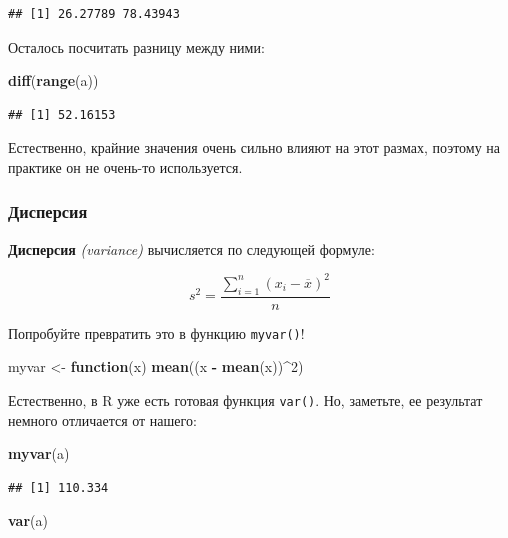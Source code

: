 \documentclass[]{book}
\newenvironment{Shaded}{\begin{snugshade}}{\end{snugshade}}
\newcommand{\KeywordTok}[1]{\textcolor[rgb]{0.13,0.29,0.53}{\textbf{#1}}}
\newcommand{\DecValTok}[1]{\textcolor[rgb]{0.00,0.00,0.81}{#1}}
\newcommand{\StringTok}[1]{\textcolor[rgb]{0.31,0.60,0.02}{#1}}
\newcommand{\ControlFlowTok}[1]{\textcolor[rgb]{0.13,0.29,0.53}{\textbf{#1}}}
\newcommand{\OperatorTok}[1]{\textcolor[rgb]{0.81,0.36,0.00}{\textbf{#1}}}
\newcommand{\NormalTok}[1]{#1}
\begin{document}
\begin{verbatim}
## [1] 26.27789 78.43943
\end{verbatim}

Осталось посчитать разницу между ними:

\begin{Shaded}
\begin{Highlighting}[]
\KeywordTok{diff}\NormalTok{(}\KeywordTok{range}\NormalTok{(a))}
\end{Highlighting}
\end{Shaded}

\begin{verbatim}
## [1] 52.16153
\end{verbatim}

Естественно, крайние значения очень сильно влияют на этот размах,
поэтому на практике он не очень-то используется.

\subsubsection{Дисперсия}\label{var}

\textbf{Дисперсия} \emph{(variance)} вычисляется по следующей формуле:

\[s^2= \frac{\sum\limits_{i=1}^{n} (x_{i} - \overline{x})^2} {n}\]

Попробуйте превратить это в функцию \texttt{myvar()}!

\begin{Shaded}
\begin{Highlighting}[]
\NormalTok{myvar <-}\StringTok{ }\ControlFlowTok{function}\NormalTok{(x) }\KeywordTok{mean}\NormalTok{((x }\OperatorTok{-}\StringTok{ }\KeywordTok{mean}\NormalTok{(x))}\OperatorTok{^}\DecValTok{2}\NormalTok{)}
\end{Highlighting}
\end{Shaded}

Естественно, в R уже есть готовая функция \texttt{var()}. Но, заметьте,
ее результат немного отличается от нашего:

\begin{Shaded}
\begin{Highlighting}[]
\KeywordTok{myvar}\NormalTok{(a)}
\end{Highlighting}
\end{Shaded}

\begin{verbatim}
## [1] 110.334
\end{verbatim}

\begin{Shaded}
\begin{Highlighting}[]
\KeywordTok{var}\NormalTok{(a)}
\end{Highlighting}
\end{Shaded}
\end{document}
